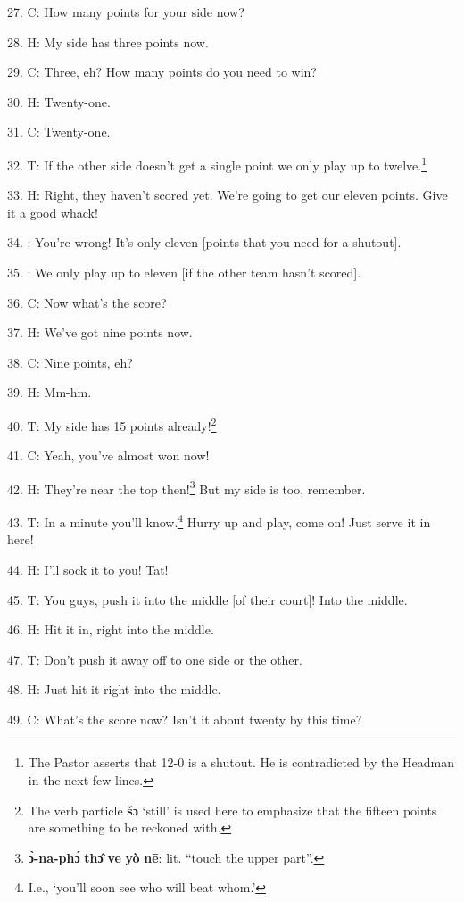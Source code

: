 27. C: How many points for your side now?

28. H: My side has three points now.

29. C: Three, eh? How many points do you need to win?

30. H: Twenty-one.

31. C: Twenty-one.

32. T: If the other side doesn't get a single point we only play up to twelve.\footnote{The Pastor asserts that 12-0 is a shutout. He is contradicted by the Headman in the next few lines.}

33. H: Right, they haven't scored yet. We're going to get our eleven points. Give
it a good whack!

34. : You're wrong! It's only eleven [points that you need for a shutout].

35. : We only play up to eleven [if the other team hasn't scored].

36. C: Now what's the score?

37. H: We've got nine points now.

38. C: Nine points, eh?

39. H: Mm-hm.


40. T: My side has 15 points already!\footnote{The verb particle \textbf{šɔ} `still' is used here to emphasize that the fifteen points are something to be reckoned with.}

41. C: Yeah, you've almost won now!

42. H: They're near the top then!\footnote{\textbf{ɔ̀-na-phɔ́} \textbf{thɔ̂} \textbf{ve} \textbf{yò} \textbf{nē}: lit. ``touch the upper part''.} But my side is too, remember.

43. T: In a minute you'll know.\footnote{I.e., `you'll soon see who will beat whom.'} Hurry up and play, come on! Just serve it in
here!

44. H: I'll sock it to you! Tat!


45. T: You guys, push it into the middle [of their court]! Into the middle.

46. H: Hit it in, right into the middle.

47. T: Don't push it away off to one side or the other.

48. H: Just hit it right into the middle.

49. C: What's the score now? Isn't it about twenty by this time?

